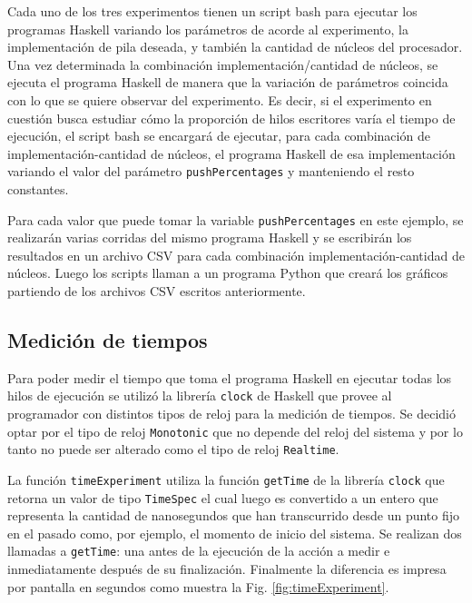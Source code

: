 
Cada uno de los tres experimentos tienen un script bash para ejecutar los programas Haskell variando los parámetros de acorde al experimento, la implementación de pila deseada, y también la cantidad de núcleos del procesador.
Una vez determinada la combinación implementación/cantidad de núcleos, se ejecuta el programa Haskell de manera que la variación de parámetros coincida con lo que se quiere observar del experimento.
Es decir, si el experimento en cuestión busca estudiar cómo la proporción de hilos escritores varía el tiempo de ejecución, el script bash se encargará de ejecutar, para cada combinación de implementación-cantidad de núcleos, el programa Haskell de esa implementación variando el valor del parámetro \texttt{pushPercentages} y manteniendo el resto constantes.

Para cada valor que puede tomar la variable \texttt{pushPercentages} en este ejemplo, se realizarán varias corridas del mismo programa Haskell y se escribirán los resultados en un archivo CSV para cada combinación implementación-cantidad de núcleos.
Luego los scripts llaman a un programa Python que creará los gráficos partiendo de los archivos CSV escritos anteriormente.

\subsection{Medición de tiempos}\label{time-measuring}
Para poder medir el tiempo que toma el programa Haskell en ejecutar todas los hilos de ejecución se utilizó la librería \texttt{clock} \cite{timeMeasuring} de Haskell que provee al programador con distintos tipos de reloj para la medición de tiempos. Se decidió optar por el tipo de reloj \texttt{Monotonic} que no depende del reloj del sistema y por lo tanto no puede ser alterado como el tipo de reloj \texttt{Realtime}.

La función \texttt{timeExperiment} utiliza la función \texttt{getTime} de la librería \texttt{clock} que retorna un valor de tipo \texttt{TimeSpec} el cual luego es convertido a un entero que representa la cantidad de nanosegundos que han transcurrido desde un punto fijo en el pasado como, por ejemplo, el momento de inicio del sistema.
Se realizan dos llamadas a \texttt{getTime}: una antes de la ejecución de la acción a medir e inmediatamente después de su finalización. Finalmente la diferencia es impresa por pantalla en segundos como muestra la Fig. \ref{fig:timeExperiment}.

